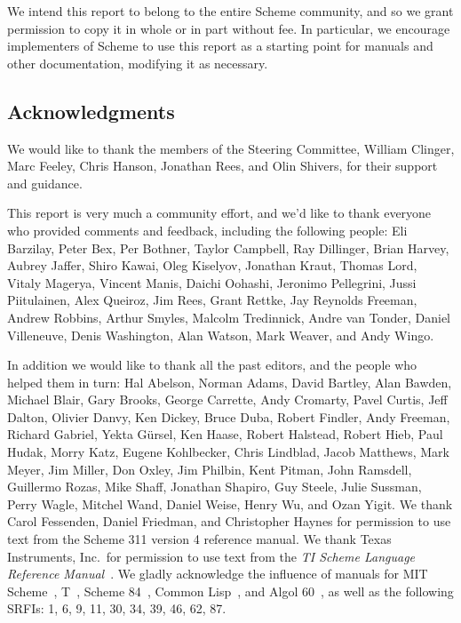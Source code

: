 \medskip

We intend this report to belong to the entire Scheme community, and so
we grant permission to copy it in whole or in part without fee.  In
particular, we encourage implementers of Scheme to use this report as
a starting point for manuals and other documentation, modifying it as
necessary.




\subsection*{Acknowledgments}

We would like to thank the members of the Steering Committee, William
Clinger, Marc Feeley, Chris Hanson, Jonathan Rees, and Olin Shivers, for
their support and guidance.

This report is very much a community effort, and we'd like to thank
everyone who provided comments and feedback, including the following people:
Eli Barzilay, Peter Bex, Per Bothner, Taylor Campbell, Ray Dillinger,
Brian Harvey, Aubrey Jaffer, Shiro Kawai, Oleg Kiselyov, Jonathan
Kraut, Thomas Lord, Vitaly Magerya, Vincent Manis, Daichi Oohashi,
Jeronimo Pellegrini, Jussi Piitulainen, Alex Queiroz, Jim Rees, Grant
Rettke, Jay Reynolds Freeman, Andrew Robbins, Arthur Smyles, Malcolm
Tredinnick, Andre van Tonder, Daniel Villeneuve, Denis Washington,
Alan Watson, Mark Weaver, and Andy Wingo.

In addition we would like to thank all the past editors, and the
people who helped them in turn: Hal Abelson, Norman Adams, David
Bartley, Alan Bawden, Michael Blair, Gary Brooks, George Carrette,
Andy Cromarty, Pavel Curtis, Jeff Dalton, Olivier Danvy, Ken Dickey,
Bruce Duba, Robert Findler, Andy Freeman, Richard Gabriel, Yekta
G\"ursel, Ken Haase, Robert Halstead, Robert Hieb, Paul Hudak, Morry
Katz, Eugene Kohlbecker, Chris Lindblad, Jacob Matthews, Mark Meyer,
Jim Miller, Don Oxley, Jim Philbin, Kent Pitman, John Ramsdell,
Guillermo Rozas, Mike Shaff, Jonathan Shapiro, Guy Steele, Julie
Sussman, Perry Wagle, Mitchel Wand, Daniel Weise, Henry Wu, and Ozan
Yigit.  We thank Carol Fessenden, Daniel Friedman, and Christopher
Haynes for permission to use text from the Scheme 311 version 4
reference manual.  We thank Texas Instruments, Inc.~for permission to
use text from the {\em TI Scheme Language Reference
Manual}~\cite{TImanual85}.  We gladly acknowledge the influence of
manuals for MIT Scheme~\cite{MITScheme}, T~\cite{Rees84}, Scheme
84~\cite{Scheme84}, Common Lisp~\cite{CLtL}, and Algol 60~\cite{Naur63},
as well as the following SRFIs:  1, 6, 9, 11, 30, 34, 39, 46, 62, 87.

